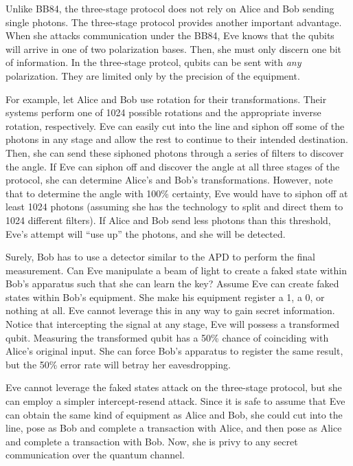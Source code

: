 \documentclass[12pt,twocolumn]{article}
\begin{document}
Unlike BB84, the three-stage protocol does not rely on Alice and Bob sending single photons.
The three-stage protocol provides another important advantage. When she attacks communication under the BB84, Eve knows that the qubits will arrive in one of two polarization bases.
Then, she must only discern one bit of information.
In the three-stage protcol, qubits can be sent with \emph{any} polarization.
They are limited only by the precision of the equipment.

For example, let Alice and Bob use rotation for their transformations.
Their systems perform one of 1024 possible rotations and the appropriate inverse rotation, respectively.
Eve can easily cut into the line\cite{makarov:05} and siphon off some of the photons in any stage and allow the rest to continue to their intended destination.
Then, she can send these siphoned photons through a series of filters to discover the angle.
If Eve can siphon off and discover the angle at all three stages of the protocol, she can determine Alice's and Bob's transformations.
However, note that to determine the angle with 100\% certainty, Eve would have to siphon off at least 1024 photons (assuming she has the technology to split and direct them to 1024 different filters).
If Alice and Bob send less photons than this threshold, Eve's attempt will ``use up'' the photons, and she will be detected.

Surely, Bob has to use a detector similar to the APD to perform the final measurement.
Can Eve manipulate a beam of light to create a faked state within Bob's apparatus such that she can learn the key?
Assume Eve can create faked states within Bob's equipment.
She make his equipment register a 1, a 0, or nothing at all.
Eve cannot leverage this in any way to gain secret information.
Notice that intercepting the signal at any stage, Eve will possess a transformed qubit.
Measuring the transformed qubit has a 50\% chance of coinciding with Alice's original input.
She can force Bob's apparatus to register the same result, but the 50\% error rate will betray her eavesdropping.

Eve cannot leverage the faked states attack on the three-stage protocol, but she can employ a simpler intercept-resend attack.
Since it is safe to assume that Eve can obtain the same kind of equipment as Alice and Bob, she could cut into the line, pose as Bob and complete a transaction with Alice, and then pose as Alice and complete a transaction with Bob.
Now, she is privy to any secret communication over the quantum channel.
\end{document}
